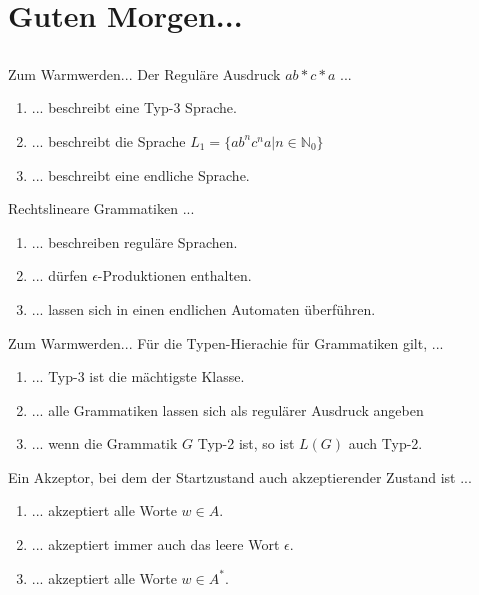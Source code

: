 \section[Einstieg]{Guten Morgen...}
\subsection*{}
\begin{frame}{Zum Warmwerden...}
	 Der Reguläre Ausdruck $a{b*}{c*}a$ ...
	   \begin{enumerate}
	   \item { \only<2->{ \color{green!50!black} }
	   ... beschreibt eine Typ-3 Sprache.
	   }
	   \item { \only<2->{ \color{red} }
	   ... beschreibt die Sprache $L_1=\{ab^nc^na | n \in \mathbb{N}_0\}$
	   }
	   \item { \only<2->{ \color{red} }
	   ... beschreibt eine endliche Sprache.
	   }
	   \end{enumerate}

	 Rechtslineare Grammatiken ...
	   \begin{enumerate}
	   \item { \only<3->{ \color{green!50!black} }
	   ... beschreiben reguläre Sprachen.
	   }
	   \item { \only<3->{ \color{green!50!black} }
	   ... dürfen $\epsilon$-Produktionen enthalten.
	   }
	   \item { \only<3->{ \color{green!50!black} }
	   ... lassen sich in einen endlichen Automaten überführen.
	   }
	   \end{enumerate}
\end{frame}

\begin{frame}{Zum Warmwerden...}
	 Für die Typen-Hierachie für Grammatiken gilt, ...
	   \begin{enumerate}
	   \item { \only<2->{ \color{red} }
	   ... Typ-3 ist die mächtigste Klasse.
	   }
	   \item { \only<2->{ \color{red} }
	   ... alle Grammatiken lassen sich als regulärer Ausdruck angeben
	   }
	   \item { \only<2->{ \color{red} }
	   ... wenn die Grammatik $G$ Typ-2 ist, so ist $L(G)$ auch Typ-2.
	   }
	   \end{enumerate}
	   
	   
	 Ein Akzeptor, bei dem der Startzustand auch akzeptierender Zustand ist ...
	   \begin{enumerate}
	   \item { \only<3>{ \color{red} }
	   ... akzeptiert alle Worte $w \in A $.
	   }
	   \item { \only<3>{ \color{green!50!black} }
	   ... akzeptiert immer auch das leere Wort $ \epsilon $.
	   }
	   \item { \only<3>{ \color{red} }
	   ... akzeptiert alle Worte $w \in A^* $.
	   }
	   \end{enumerate}
\end{frame}
